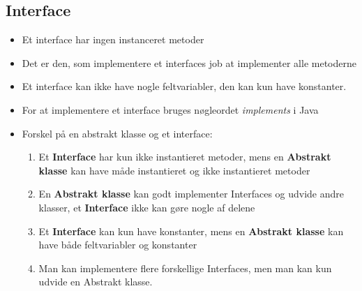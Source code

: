 \documentclass{article}
\begin{document}
\subsection{Interface}
\begin{itemize}
	\item Et interface har ingen instanceret metoder
	\item Det er den, som implementere et interfaces job at implementer alle metoderne
	\item Et interface kan ikke have nogle feltvariabler, den kan kun have konstanter. 
	\item For at implementere et interface bruges nøgleordet \textit{implements} i Java
	\item Forskel på en abstrakt klasse og et interface:
	\begin{enumerate}
		\item Et \textbf{Interface} har kun ikke instantieret metoder, mens en \textbf{Abstrakt klasse} kan have måde instantieret og ikke instantieret metoder 
		\item En \textbf{Abstrakt klasse} kan godt implementer Interfaces og udvide andre klasser, et \textbf{Interface} ikke kan gøre nogle af delene
		\item Et \textbf{Interface} kan kun have konstanter, mens en \textbf{Abstrakt klasse} kan have både feltvariabler og konstanter
		\item Man kan implementere flere forskellige Interfaces, men man kan kun udvide en Abstrakt klasse.
	\end{enumerate}
\end{itemize}



\newpage
\end{document}

